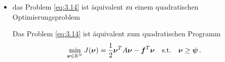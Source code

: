\begin{itemize}
\begin{proof}
Wir nun nehmen an, dass ein $i \in \{1,\ldots,N\}$ existiert, so dass $(A\bs\mu - \bs f)_i (\bs\mu-\bs\psi)_i >0$ ist. Weiter wählen wir
\[
	\bs\nu = \begin{pmatrix}
				\mu_1 \\
				\vdots \\
				\mu_{i-1} \\
				0 \\
				\mu_{i+1}\\
				\vdots \\
				\mu_N
			\end{pmatrix} + 
			\begin{pmatrix}
				0 \\
				\vdots \\
				0\\
				\psi_i \\
				0\\
				\vdots \\
				0
			\end{pmatrix} \ge \bs\psi
\]
und damit folgt
\begin{align*}
	0 > (A\bs \mu - \bs f)_i (\bs\psi - \bs\mu)_i  = (A\bs\mu-\bs f)^T (\bs \nu-\bs \mu) \ge 0 \, ,
\end{align*}
was im Widerspruch zu \eqref{eq:3.14} steht, daraus folgt die Behauptung.

"`$\La$"' Es sei $\bs \mu \in K_{\mcal S}$ Lösung von \eqref{eq:3.15}. Dann rechnen wir nach, dass für ein beliebiges $\bs\nu \in K_{\mcal S}$ gilt
\begin{align*}
	(A\bs \mu-\bs f)^T (\bs \nu- \bs\mu) & = (A\bs \mu-\bs f)^T (\bs \nu -\bs \psi + \bs\psi- \bs\mu) \\
	& = \underbrace{(A\bs \mu-\bs f)^T}_{\ge \bs 0} \underbrace{(\bs \nu -\bs \psi)}_{\ge \bs 0} -\underbrace{(A\bs \mu-\bs f)^T (\bs\mu-\bs\psi)}_{=0} \\
	& \ge 0\, . \qedhere
\end{align*}
\end{proof}

\item das Problem \eqref{eq:3.14} ist äquivalent zu einem quadratischen Optimierungsproblem
\begin{satz}\label{satz:3.11}
Das Problem \eqref{eq:3.14} ist äquivalent zum quadratischen Programm
\begin{align}\label{eq:3.16}
	\min_{\boldsymbol\nu \in \mathbb{R}^N} J(\boldsymbol\nu) = \frac 1 2 \boldsymbol \nu^T A \boldsymbol \nu - \boldsymbol f^T \boldsymbol \nu\quad \text{s.t.} \quad \boldsymbol \nu \ge \boldsymbol \psi \, .
\end{align}
\end{satz}


\end{itemize}
